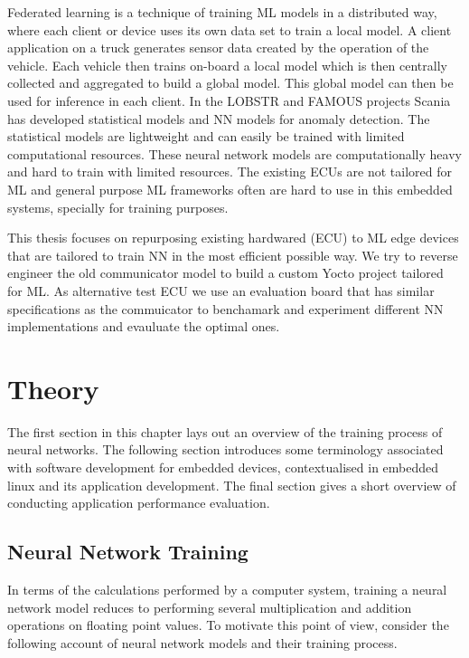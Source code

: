 Federated learning is a technique of training ML models in a distributed way, where each client or device uses its own data set to train a local model. A client application on a truck generates sensor data created by the operation of the vehicle. Each vehicle then trains on-board a local model which is then centrally collected and aggregated to build a global model. This global model can then be used for inference in each client. In the LOBSTR \cite{lobstr} and FAMOUS \cite{famous} projects Scania has developed statistical models and NN models for anomaly detection. The statistical models are lightweight and can easily be trained with limited computational resources. These neural network models are computationally heavy and hard to train with limited resources. The existing ECUs are not tailored for ML and general purpose ML frameworks often are hard to use in this embedded systems, specially for training purposes.

This thesis focuses on repurposing existing hardwared (ECU) to ML edge devices that are tailored to train NN in the most efficient possible way. We try to reverse engineer the old communicator model to build a custom Yocto project tailored for ML. As alternative test ECU we use an evaluation board that has similar specifications as the commuicator to benchamark and experiment different NN implementations and evauluate the optimal ones.



\chapter{Theory}

The first section in this chapter lays out an overview of the training process of neural networks. The following section introduces some terminology associated with software development for embedded devices, contextualised in embedded linux and its application development. The final section gives a short overview of conducting application performance evaluation.

\section{Neural Network Training}

In terms of the calculations performed by a computer system, training a neural network model reduces to performing several multiplication and addition operations on floating point values. To motivate this point of view, consider the following account of neural network models and their training process.

